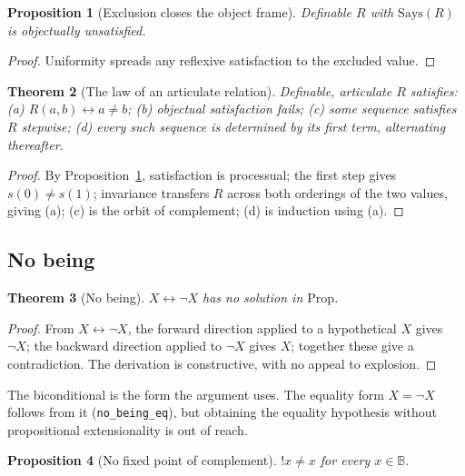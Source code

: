 \documentclass[11pt]{article}
\newtheorem{theorem}{Theorem}[section]
\newtheorem{proposition}[theorem]{Proposition}
\newcommand{\Says}{\mathrm{Says}}
\newcommand{\lf}[1]{\texttt{#1}}
\newcommand{\B}{\mathbb{B}}
\begin{document}
\begin{proposition}[Exclusion closes the object frame]
\label{prop:kills}
Definable $R$ with $\Says(R)$ is objectually unsatisfied.
\end{proposition}

\begin{proof}
Uniformity spreads any reflexive satisfaction to the excluded value.
\end{proof}

\begin{theorem}[The law of an articulate relation]
\label{thm:law}
Definable, articulate $R$ satisfies: (a) $R(a,b) \leftrightarrow a \neq b$; (b) objectual satisfaction fails; (c) some sequence satisfies $R$ stepwise; (d) every such sequence is determined by its first term, alternating thereafter.
\end{theorem}

\begin{proof}
By Proposition~\ref{prop:kills}, satisfaction is processual; the first step gives $s(0) \neq s(1)$; invariance transfers $R$ across both orderings of the two values, giving (a); (c) is the orbit of complement; (d) is induction using (a).
\end{proof}

\subsection{No being}

\begin{theorem}[No being]
\label{thm:nobeing}
$X \leftrightarrow \lnot X$ has no solution in $\mathrm{Prop}$.
\end{theorem}

\begin{proof}
From $X \leftrightarrow \lnot X$, the forward direction applied to a hypothetical $X$ gives $\lnot X$; the backward direction applied to $\lnot X$ gives $X$; together these give a contradiction. The derivation is constructive, with no appeal to explosion.
\end{proof}

The biconditional is the form the argument uses. The equality form $X = \lnot X$ follows from it (\lf{no\_being\_eq}), but obtaining the equality hypothesis without propositional extensionality is out of reach.

\begin{proposition}[No fixed point of complement]
\label{prop:nofix}
$!x \neq x$ for every $x \in \B$.
\end{proposition}
\end{document}
